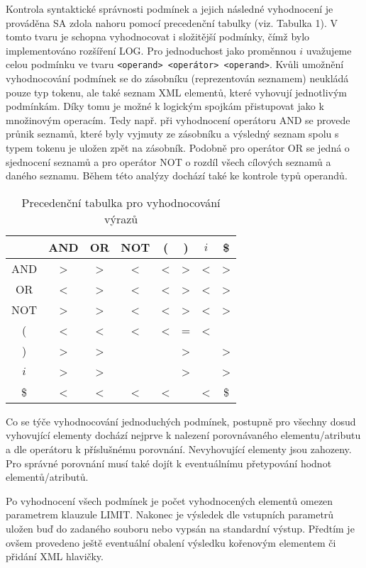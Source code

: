 \documentclass[a4paper,10pt]{article}
\begin{document}
Kontrola syntaktické správnosti podmínek a jejich následné vyhodnocení je prováděna SA zdola nahoru pomocí
precedenční tabulky (viz. Tabulka 1). V tomto tvaru je schopna vyhodnocovat i složitější podmínky, čímž bylo implementováno
rozšíření LOG. Pro jednoduchost jako proměnnou $i$ uvažujeme celou podmínku ve tvaru 
\texttt{<operand> <operátor> <operand>}. Kvůli umožnění vyhodnocování podmínek se do zásobníku (reprezentován 
seznamem) neukládá pouze typ tokenu, ale také seznam XML elementů, které vyhovují jednotlivým podmínkám. Díky tomu 
je možné k logickým spojkám přistupovat jako k množinovým operacím. Tedy např. při vyhodnocení
operátoru AND se provede průnik seznamů, které byly vyjmuty ze zásobníku a výsledný seznam spolu s 
typem tokenu je uložen zpět na zásobník. Podobně pro operátor OR se jedná o sjednocení seznamů a pro 
operátor NOT o rozdíl všech cílových seznamů a daného seznamu. Během této analýzy dochází také
ke kontrole typů operandů. 

\begin{table}
  \centering
  \begin{tabular}{|c|c|c|c|c|c|c|c|}
    \hline
    & AND & OR & NOT & ( & ) & $i$ & \$ \\
    \hline
    AND & \textgreater & \textgreater & \textless & \textless & \textgreater & \textless & \textgreater \\ \hline
    OR & \textless & \textgreater & \textless & \textless & \textgreater & \textless & \textgreater \\ \hline
    NOT & \textgreater & \textgreater & \textless & \textless & \textgreater & \textless & \textgreater \\ \hline
    ( & \textless & \textless & \textless & \textless & = & \textless & \\ \hline
    ) & \textgreater & \textgreater & & & \textgreater & & \textgreater \\ \hline
    $i$ & \textgreater & \textgreater & & & \textgreater & & \textgreater \\ \hline
    \$ & \textless & \textless & \textless & \textless & & \textless & \$ \\
    \hline
  \end{tabular}
  \caption{Precedenční tabulka pro vyhodnocování výrazů}
\end{table}


Co se týče vyhodnocování jednoduchých podmínek, postupně pro všechny dosud 
vyhovující elementy dochází nejprve k nalezení porovnávaného elementu/atributu a dle operátoru k příslušnému 
porovnání. Nevyhovující elementy jsou zahozeny. Pro správné porovnání musí také dojít k eventuálnímu 
přetypování hodnot elementů/atributů.

Po vyhodnocení všech podmínek je počet vyhodnocených elementů omezen parametrem klauzule LIMIT. 
Nakonec je výsledek dle vstupních parametrů uložen buď do zadaného souboru nebo vypsán na standardní výstup.
Předtím je ovšem provedeno ještě eventuální obalení výsledku kořenovým elementem či přidání XML hlavičky.
\end{document}
